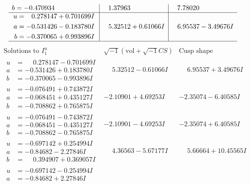 \documentclass[1p]{elsarticle_modified}
\theoremstyle{definition}
\newcommand{\I}{\sqrt{-1}}
\begin{document}
$$\begin{array}{c|c|c}
\begin{aligned}
b &= -0.470934\phantom{ +0.000000I}\end{aligned}
 & \phantom{-}1.37963\phantom{ +0.000000I} & \phantom{-}7.78020\phantom{ +0.000000I} \\ \hline\begin{aligned}
u &= \phantom{-}0.278147 + 0.701699 I \\
a &= -0.531426 - 0.183780 I \\
b &= -0.370065 + 0.993896 I\end{aligned}
 & \phantom{-}5.32512 + 0.61066 I & \phantom{-}6.95537 - 3.49676 I\\
 \hline 
 \end{array}$$\newpage$$\begin{array}{c|c|c}  
\text{Solutions to }I^u_{1}& \I (\text{vol} + \sqrt{-1}CS) & \text{Cusp shape}\\
 \hline 
\begin{aligned}
u &= \phantom{-}0.278147 - 0.701699 I \\
a &= -0.531426 + 0.183780 I \\
b &= -0.370065 - 0.993896 I\end{aligned}
 & \phantom{-}5.32512 - 0.61066 I & \phantom{-}6.95537 + 3.49676 I \\ \hline\begin{aligned}
u &= -0.076491 + 0.743872 I \\
a &= -0.068451 + 0.435127 I \\
b &= -0.708862 + 0.765875 I\end{aligned}
 & -2.10901 + 4.69253 I & -2.35074 - 6.40585 I \\ \hline\begin{aligned}
u &= -0.076491 - 0.743872 I \\
a &= -0.068451 - 0.435127 I \\
b &= -0.708862 - 0.765875 I\end{aligned}
 & -2.10901 - 4.69253 I & -2.35074 + 6.40585 I \\ \hline\begin{aligned}
u &= -0.697142 + 0.254994 I \\
a &= -0.84682 - 2.27846 I \\
b &= \phantom{-}0.394907 + 0.369057 I\end{aligned}
 & \phantom{-}4.36563 - 5.67177 I & \phantom{-}5.66664 + 10.45565 I \\ \hline\begin{aligned}
u &= -0.697142 - 0.254994 I \\
a &= -0.84682 + 2.27846 I \\

\end{aligned}
\end{array}$$
\end{document}
